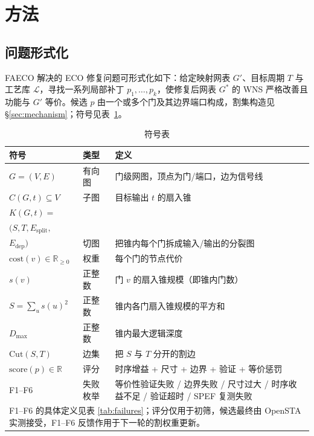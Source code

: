 \documentclass[journal]{IEEEtran}
\begin{document}
\section{方法}

\subsection{问题形式化}
FAECO 解决的 ECO 修复问题可形式化如下：给定映射网表 $G'$、目标周期 $T$ 与工艺库 $\mathcal{L}$，寻找一系列局部补丁 $p_1,\dots,p_k$，使修复后网表 $G^*$ 的 WNS 严格改善且功能与 $G'$ 等价。候选 $p$ 由一个或多个门及其边界端口构成，割集构造见 \S\ref{sec:mechanism}；符号见表~\ref{tab:symbols}。

\begin{table}[!t]
\centering
\caption{符号表}
\label{tab:symbols}
\scriptsize
\setlength{\tabcolsep}{2pt}
\begin{tabular}{p{3.4cm}p{1.5cm}p{3.4cm}}
\toprule
\textbf{符号} & \textbf{类型} & \textbf{定义} \\
\midrule
$G = (V, E)$ & 有向图 & 门级网图，顶点为门/端口，边为信号线 \\
$C(G, t) \subseteq V$ & 子图 & 目标输出 $t$ 的扇入锥 \\
$K(G, t) =$ \\
$(S, T, E_{\mathrm{split}},$ \\
$E_{\mathrm{dep}})$ & 切图 & 把锥内每个门拆成输入/输出的分裂图 \\
$\mathrm{cost}(v) \in \mathbb{R}_{\geq 0}$ & 权重 & 每个门的节点代价 \\
$s(v)$ & 正整数 & 门 $v$ 的扇入锥规模（即锥内门数）\\
$S = \sum_u s(u)^2$ & 正整数 & 锥内各门扇入锥规模的平方和 \\

$D_{\max}$ & 正整数 & 锥内最大逻辑深度 \\
$\mathrm{Cut}(S, T)$ & 边集 & 把 $S$ 与 $T$ 分开的割边 \\
$\mathrm{score}(p) \in \mathbb{R}$ & 评分 & 时序增益 + 尺寸 + 边界 + 验证 + 等价惩罚 \\
F1--F6 & 失败枚举 & 等价性验证失败 / 边界失败 / 尺寸过大 / 时序收益不足 / 验证超时 / SPEF 复测失败 \\
\bottomrule
\multicolumn{3}{p{8.0cm}}{\footnotesize F1--F6 的具体定义见表 \ref{tab:failures}；评分仅用于初筛，候选最终由 OpenSTA 实测接受，F1--F6 反馈作用于下一轮的割权重更新。}\\
\end{tabular}
\end{table}
\end{document}
